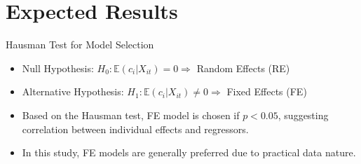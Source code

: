 \documentclass{beamer}
\begin{document}
    \section{Expected Results}

\begin{frame}{Hausman Test for Model Selection}
    \begin{itemize}
        \item Null Hypothesis: \( H_0 : \mathbb{E}(c_i | X_{it}) = 0 \Rightarrow \) Random Effects (RE)
        \item Alternative Hypothesis: \( H_1 : \mathbb{E}(c_i | X_{it}) \neq 0 \Rightarrow \) Fixed Effects (FE)
        \item Based on the Hausman test, FE model is chosen if \( p < 0.05 \), suggesting correlation between individual effects and regressors.
        \item In this study, FE models are generally preferred due to practical data nature.
    \end{itemize}
\end{frame}
\end{document}
